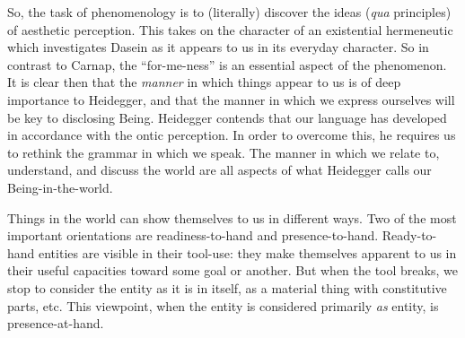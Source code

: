 \documentclass[leqno, 12pt]{turabian-researchpaper}
\begin{document}
	So, the task of phenomenology is to (literally) discover the ideas (\textit{qua}
	principles) of aesthetic perception. This takes on the character of an existential
	hermeneutic which investigates Dasein as it appears to us in its everyday character.
	So in contrast to Carnap, the \enquote{for-me-ness} is an essential aspect of
	the phenomenon. It is clear then that the \textit{manner} in which things
	appear to us is of deep importance to Heidegger, and that the manner in which we
	express ourselves will be key to disclosing Being. Heidegger contends that our
	language has developed in accordance with the ontic perception. In order to overcome
	this, he requires us to rethink the grammar in which we speak. The manner in which
	we relate to, understand, and discuss the world are all aspects of what Heidegger
	calls our Being-in-the-world.


	Things in the world can show themselves to us in different ways. Two of the most
	important orientations are readiness-to-hand and presence-to-hand. Ready-to-hand
	entities are visible in their tool-use: they make themselves apparent to us in
	their useful capacities toward some goal or another. But when the tool breaks,
	we stop to consider the entity as it is in itself, as a material thing with
	constitutive parts, etc. This viewpoint, when the entity is considered primarily
	\emph{as} entity, is presence-at-hand.
\end{document}

